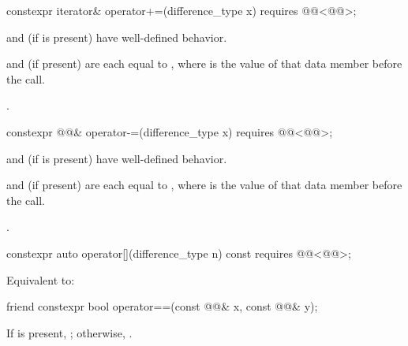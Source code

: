 \begin{itemdecl}
constexpr iterator& operator+=(difference_type x)
  requires @@<@@>;
\end{itemdecl}

\begin{itemdescr}
\pnum
\expects
{} and  (if  is present)
have well-defined behavior.

\pnum
\ensures
{} and  (if present) are
each equal to ,
where  is the value of that data member before the call.

\pnum
\returns
{}.
\end{itemdescr}

\begin{itemdecl}
constexpr @@& operator-=(difference_type x)
  requires @@<@@>;
\end{itemdecl}

\begin{itemdescr}
\pnum
\expects
{} and  (if  is present)
have well-defined behavior.

\pnum
\ensures
{} and  (if present) are
each equal to ,
where  is the value of that data member before the call.

\pnum
\returns
{}.
\end{itemdescr}

\begin{itemdecl}
constexpr auto operator[](difference_type n) const
  requires @@<@@>;
\end{itemdecl}

\begin{itemdescr}
\pnum
\effects
Equivalent to: 
\end{itemdescr}

\begin{itemdecl}
friend constexpr bool operator==(const @@& x, const @@& y);
\end{itemdecl}

\begin{itemdescr}
\pnum
\returns
If  is present,
;
otherwise, .
\end{itemdescr}

